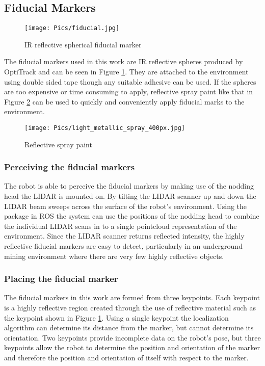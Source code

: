 \subsection{Fiducial Markers}

\begin{figure}
    \centering
    \texttt{[image: Pics/fiducial.jpg]}
    \caption{IR reflective spherical fiducial marker}
    \label{fig:fiducial}
\end{figure}

The fiducial markers used in this work are IR reflective spheres produced by OptiTrack and can be seen in Figure \ref{fig:fiducial}. They are attached to the environment using double sided tape though any suitable adhesive can be used. If the spheres are too expensive or time consuming to apply, reflective spray paint like that in Figure \ref{fig:irspray} can be used to quickly and conveniently apply fiducial marks to the environment.\\

\begin{figure}
    \centering
    \texttt{[image: Pics/light\_metallic\_spray\_400px.jpg]}
    \caption{Reflective spray paint \cite{spraypaint}}
    \label{fig:irspray}
\end{figure}

\subsubsection{Perceiving the fiducial markers}

The robot is able to perceive the fiducial markers by making use of the nodding head the LIDAR is mounted on. By tilting the LIDAR scanner up and down the LIDAR beam sweeps across the surface of the robot's environment. Using the  package in ROS the system can use the positions of the nodding head to combine the individual LIDAR scans in to a single pointcloud representation of the environment. Since the LIDAR scanner returns reflected intensity, the highly reflective fiducial markers are easy to detect, particularly in an underground mining environment where there are very few highly reflective objects.\\

\subsubsection{Placing the fiducial marker}

The fiducial markers in this work are formed from three keypoints. Each keypoint is a highly reflective region created through the use of reflective material such as the keypoint shown in Figure \ref{fig:fiducial}. Using a single keypoint the localization algorithm can determine its distance from the marker, but cannot determine its orientation. Two keypoints provide incomplete data on the robot's pose, but three keypoints allow the robot to determine the position and orientation of the marker and therefore the position and orientation of itself with respect to the marker.\\

